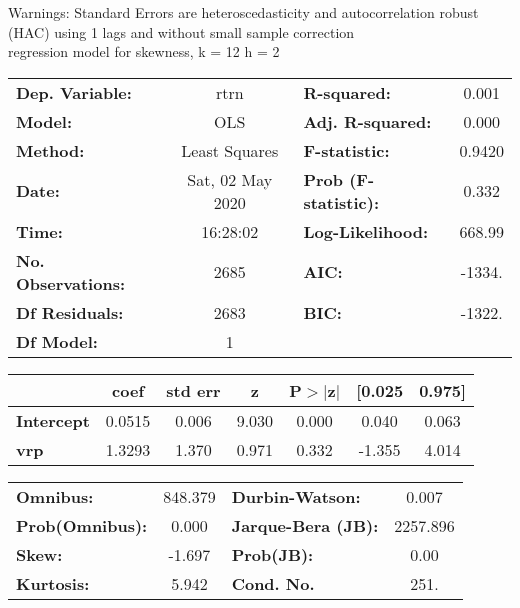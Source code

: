 Warnings: \newline
 [1] Standard Errors are heteroscedasticity and autocorrelation robust (HAC) using 1 lags and without small sample correction\\ 

regression model for skewness, k = 12 h = 2\begin{center}
\begin{tabular}{lclc}
\toprule
\textbf{Dep. Variable:}    &       rtrn       & \textbf{  R-squared:         } &     0.001   \\
\textbf{Model:}            &       OLS        & \textbf{  Adj. R-squared:    } &     0.000   \\
\textbf{Method:}           &  Least Squares   & \textbf{  F-statistic:       } &    0.9420   \\
\textbf{Date:}             & Sat, 02 May 2020 & \textbf{  Prob (F-statistic):} &    0.332    \\
\textbf{Time:}             &     16:28:02     & \textbf{  Log-Likelihood:    } &    668.99   \\
\textbf{No. Observations:} &        2685      & \textbf{  AIC:               } &    -1334.   \\
\textbf{Df Residuals:}     &        2683      & \textbf{  BIC:               } &    -1322.   \\
\textbf{Df Model:}         &           1      & \textbf{                     } &             \\
\bottomrule
\end{tabular}
\begin{tabular}{lcccccc}
                   & \textbf{coef} & \textbf{std err} & \textbf{z} & \textbf{P$> |$z$|$} & \textbf{[0.025} & \textbf{0.975]}  \\
\midrule
\textbf{Intercept} &       0.0515  &        0.006     &     9.030  &         0.000        &        0.040    &        0.063     \\
\textbf{vrp}       &       1.3293  &        1.370     &     0.971  &         0.332        &       -1.355    &        4.014     \\
\bottomrule
\end{tabular}
\begin{tabular}{lclc}
\textbf{Omnibus:}       & 848.379 & \textbf{  Durbin-Watson:     } &    0.007  \\
\textbf{Prob(Omnibus):} &   0.000 & \textbf{  Jarque-Bera (JB):  } & 2257.896  \\
\textbf{Skew:}          &  -1.697 & \textbf{  Prob(JB):          } &     0.00  \\
\textbf{Kurtosis:}      &   5.942 & \textbf{  Cond. No.          } &     251.  \\
\bottomrule
\end{tabular}
\end{center}

